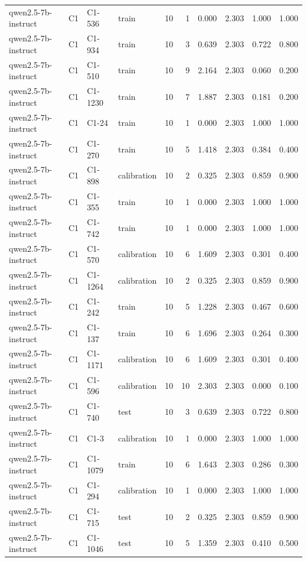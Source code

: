 \begin{table}
\begin{tabular}{llllrrrrrr}
qwen2.5-7b-instruct & C1 & C1-536 & train & 10 & 1 & 0.000 & 2.303 & 1.000 & 1.000 \\
qwen2.5-7b-instruct & C1 & C1-934 & train & 10 & 3 & 0.639 & 2.303 & 0.722 & 0.800 \\
qwen2.5-7b-instruct & C1 & C1-510 & train & 10 & 9 & 2.164 & 2.303 & 0.060 & 0.200 \\
qwen2.5-7b-instruct & C1 & C1-1230 & train & 10 & 7 & 1.887 & 2.303 & 0.181 & 0.200 \\
qwen2.5-7b-instruct & C1 & C1-24 & train & 10 & 1 & 0.000 & 2.303 & 1.000 & 1.000 \\
qwen2.5-7b-instruct & C1 & C1-270 & train & 10 & 5 & 1.418 & 2.303 & 0.384 & 0.400 \\
qwen2.5-7b-instruct & C1 & C1-898 & calibration & 10 & 2 & 0.325 & 2.303 & 0.859 & 0.900 \\
qwen2.5-7b-instruct & C1 & C1-355 & train & 10 & 1 & 0.000 & 2.303 & 1.000 & 1.000 \\
qwen2.5-7b-instruct & C1 & C1-742 & train & 10 & 1 & 0.000 & 2.303 & 1.000 & 1.000 \\
qwen2.5-7b-instruct & C1 & C1-570 & calibration & 10 & 6 & 1.609 & 2.303 & 0.301 & 0.400 \\
qwen2.5-7b-instruct & C1 & C1-1264 & calibration & 10 & 2 & 0.325 & 2.303 & 0.859 & 0.900 \\
qwen2.5-7b-instruct & C1 & C1-242 & train & 10 & 5 & 1.228 & 2.303 & 0.467 & 0.600 \\
qwen2.5-7b-instruct & C1 & C1-137 & train & 10 & 6 & 1.696 & 2.303 & 0.264 & 0.300 \\
qwen2.5-7b-instruct & C1 & C1-1171 & calibration & 10 & 6 & 1.609 & 2.303 & 0.301 & 0.400 \\
qwen2.5-7b-instruct & C1 & C1-596 & calibration & 10 & 10 & 2.303 & 2.303 & 0.000 & 0.100 \\
qwen2.5-7b-instruct & C1 & C1-740 & test & 10 & 3 & 0.639 & 2.303 & 0.722 & 0.800 \\
qwen2.5-7b-instruct & C1 & C1-3 & calibration & 10 & 1 & 0.000 & 2.303 & 1.000 & 1.000 \\
qwen2.5-7b-instruct & C1 & C1-1079 & train & 10 & 6 & 1.643 & 2.303 & 0.286 & 0.300 \\
qwen2.5-7b-instruct & C1 & C1-294 & calibration & 10 & 1 & 0.000 & 2.303 & 1.000 & 1.000 \\
qwen2.5-7b-instruct & C1 & C1-715 & test & 10 & 2 & 0.325 & 2.303 & 0.859 & 0.900 \\
qwen2.5-7b-instruct & C1 & C1-1046 & test & 10 & 5 & 1.359 & 2.303 & 0.410 & 0.500 \\

\end{tabular}
\end{table}
